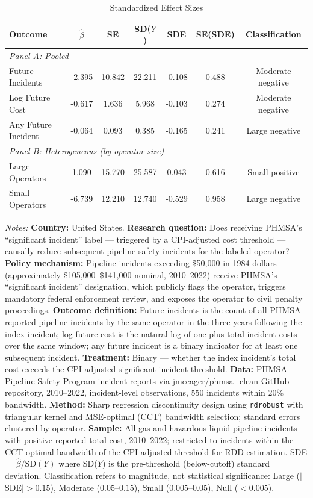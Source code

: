 \begin{table}[htbp]
\centering
\caption{Standardized Effect Sizes}
\label{tab:sde}
\begin{tabular}{lcccccc}
\hline\hline
Outcome & $\hat{\beta}$ & SE & SD($Y$) & SDE & SE(SDE) & Classification \\
\hline
\multicolumn{7}{l}{\textit{Panel A: Pooled}} \\
Future Incidents & -2.395 & 10.842 & 22.211 & -0.108 & 0.488 & Moderate negative \\
Log Future Cost & -0.617 & 1.636 & 5.968 & -0.103 & 0.274 & Moderate negative \\
Any Future Incident & -0.064 & 0.093 & 0.385 & -0.165 & 0.241 & Large negative \\
\hline
\multicolumn{7}{l}{\textit{Panel B: Heterogeneous (by operator size)}} \\
Large Operators & 1.090 & 15.770 & 25.587 & 0.043 & 0.616 & Small positive \\
Small Operators & -6.739 & 12.210 & 12.740 & -0.529 & 0.958 & Large negative \\
\hline\hline
\end{tabular}
\par\vspace{0.3em}
{\small
\textit{Notes:} \textbf{Country:} United States. \textbf{Research question:} Does receiving PHMSA's ``significant incident'' label --- triggered by a CPI-adjusted cost threshold --- causally reduce subsequent pipeline safety incidents for the labeled operator? \textbf{Policy mechanism:} Pipeline incidents exceeding \$50,000 in 1984 dollars (approximately \$105,000--\$141,000 nominal, 2010--2022) receive PHMSA's ``significant incident'' designation, which publicly flags the operator, triggers mandatory federal enforcement review, and exposes the operator to civil penalty proceedings. \textbf{Outcome definition:} Future incidents is the count of all PHMSA-reported pipeline incidents by the same operator in the three years following the index incident; log future cost is the natural log of one plus total incident costs over the same window; any future incident is a binary indicator for at least one subsequent incident. \textbf{Treatment:} Binary --- whether the index incident's total cost exceeds the CPI-adjusted significant incident threshold. \textbf{Data:} PHMSA Pipeline Safety Program incident reports via jmceager/phmsa\_clean GitHub repository, 2010--2022, incident-level observations, 550 incidents within 20\% bandwidth. \textbf{Method:} Sharp regression discontinuity design using \texttt{rdrobust} with triangular kernel and MSE-optimal (CCT) bandwidth selection; standard errors clustered by operator. \textbf{Sample:} All gas and hazardous liquid pipeline incidents with positive reported total cost, 2010--2022; restricted to incidents within the CCT-optimal bandwidth of the CPI-adjusted threshold for RDD estimation. SDE $= \hat{\beta} / \text{SD}(Y)$ where SD($Y$) is the pre-threshold (below-cutoff) standard deviation. Classification refers to magnitude, not statistical significance: Large ($|$SDE$| > 0.15$), Moderate ($0.05$--$0.15$), Small ($0.005$--$0.05$), Null ($< 0.005$). 
}
\end{table}
